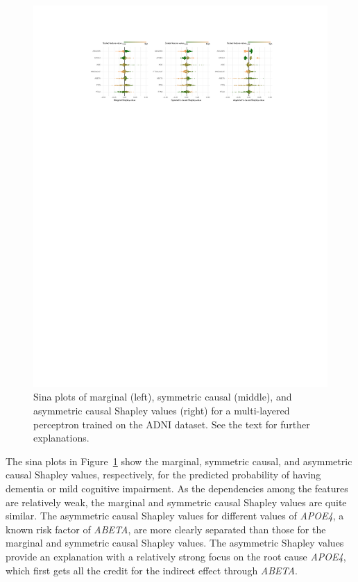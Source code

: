 \documentclass{article}
\begin{document}
\begin{figure}[t]
	\includegraphics[width=\textwidth]{figures/sina_plot_adni.pdf}
	\caption{Sina plots of marginal (left), symmetric causal (middle), and asymmetric causal Shapley values (right) for a multi-layered perceptron trained on the ADNI dataset. See the text for further explanations.}
	\label{fig:sina_adni}
\end{figure}

The sina plots in Figure~\ref{fig:sina_adni} show the marginal, symmetric causal, and asymmetric causal Shapley values, respectively, for the predicted probability of having dementia or mild cognitive impairment. As the dependencies among the features are relatively weak, the marginal and symmetric causal Shapley values are quite similar. The asymmetric causal Shapley values for different values of {\em APOE4}, a known risk factor of {\em ABETA}, are more clearly separated than those for the marginal and symmetric causal Shapley values. The asymmetric Shapley values provide an explanation with a relatively strong focus on the root cause {\em APOE4}, which first gets all the credit for the indirect effect through {\em ABETA}.
\end{document}

